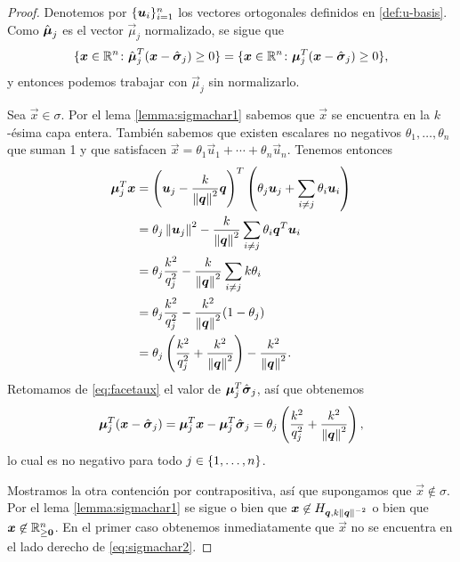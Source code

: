 \begin{proof}
	Denotemos por $\lbrace \boldsymbol{u}_i \rbrace_{i=1}^{n}$ los vectores ortogonales definidos en
	\eqref{def:u-basis}. Como $\hat{\boldsymbol{\mu}}_j$ es el vector $\vec{\mu}_j$ normalizado, se sigue que
	\begin{equation*}
		\lbrace  \boldsymbol{x} \in \mathbb{R}^n \colon \hat{\boldsymbol{\mu}}_j^T(\boldsymbol{x} - \hat{\boldsymbol{ \sigma }}_j) \geq 0 \rbrace
		=
		\lbrace  \boldsymbol{x} \in \mathbb{R}^n \colon \boldsymbol{\mu}_j^T(\boldsymbol{x} - \hat{\boldsymbol{ \sigma }}_j) \geq 0 \rbrace,
	\end{equation*}
	y entonces podemos trabajar con $\vec{\mu}_j$ sin normalizarlo. 

	Sea $\vec{x} \in \sigma$. Por el lema \ref{lemma:sigmachar1} sabemos que
	$\vec{x}$ se encuentra en la $k$-ésima capa entera. También sabemos que existen escalares no
	negativos $\theta_1, \ldots, \theta_n$ que suman 1 y que satisfacen $\vec{x} = \theta_1\vec{u}_1
	+ \cdots + \theta_n\vec{u}_n$. Tenemos entonces
	\begin{align*}
		\boldsymbol{\mu}_j^T\boldsymbol{x}
		&=
		\left(\boldsymbol{u}_j - \frac{k}{\left\lVert \boldsymbol{q} \right\rVert^2}\boldsymbol{q}\right)^T
		\left(\theta_j\boldsymbol{u}_j + \sum_{i \neq j}\theta_i\boldsymbol{u}_i\right) \\
		&= \theta_j\left\lVert \boldsymbol{u}_j \right\rVert^2 - \frac{k}{\left\lVert \boldsymbol{q} \right\rVert^2}\sum_{i \neq j}
		\theta_i\boldsymbol{q}^T\boldsymbol{u}_i \\
		&= \theta_j\frac{k^2}{q_j^2} - \frac{k}{\left\lVert \boldsymbol{q} \right\rVert^2}\sum_{i \neq j}k\theta_i \\
		&= \theta_j\frac{k^2}{q_j^2} - \frac{k^2}{\left\lVert \boldsymbol{q} \right\rVert^2}(1 - \theta_j) \\
		&= \theta_j\left(\frac{k^2}{q_j^2} + \frac{k^2}{\left\lVert \boldsymbol{q} \right\rVert^2}\right)
		- \frac{k^2}{\left\lVert \boldsymbol{q} \right\rVert^2}.
	\end{align*}
	Retomamos de \eqref{eq:facetaux} el valor de $\boldsymbol{\mu}_j^T\hat{\boldsymbol{ \sigma }}_j$, así que obtenemos
	\begin{equation*}
		\boldsymbol{\mu}_j^T(\boldsymbol{x} - \hat{\boldsymbol{ \sigma }}_j)
		= 
		\boldsymbol{\mu}_j^T\boldsymbol{x} - \boldsymbol{\mu}_j^T\hat{\boldsymbol{ \sigma }}_j
		=
		\theta_j\left(\frac{k^2}{q_j^2} + \frac{k^2}{\left\lVert \boldsymbol{q} \right\rVert^2}\right),
	\end{equation*}
	lo cual es no negativo para todo $j \in \lbrace 1, \ldots, n \rbrace$.

	Mostramos la otra contención por contrapositiva, así que supongamos que $\vec{x} \not\in
	\sigma$. Por el lema \ref{lemma:sigmachar1} se sigue o bien que $\boldsymbol{x} \not\in H_{\boldsymbol{q},
	k\left\lVert \boldsymbol{q} \right\rVert^{-2}}$ o bien que $\boldsymbol{x} \not\in \mathbb{R}^n_{\geq \boldsymbol{0}}$. En el primer caso
	obtenemos inmediatamente que $\vec{x}$ no se encuentra en el lado derecho de
	\eqref{eq:sigmachar2}.


\end{proof}
